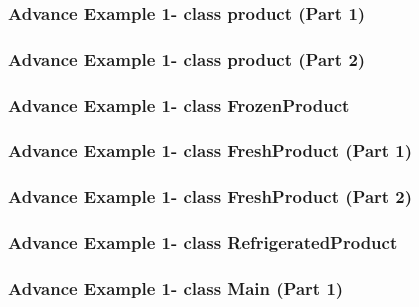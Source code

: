 \documentclass[11pt]{beamer}
\begin{document}
\begin{frame}
\frametitle{Advance Example 1- class product (Part 1)}

\end{frame}

\begin{frame}
\frametitle{Advance Example 1- class product (Part 2)}

\end{frame}

\begin{frame}
\frametitle{Advance Example 1- class FrozenProduct}

\end{frame}

\begin{frame}
\frametitle{Advance Example 1- class FreshProduct (Part 1)}

\end{frame}

\begin{frame}
\frametitle{Advance Example 1- class FreshProduct (Part 2)}

\end{frame}

\begin{frame}
\frametitle{Advance Example 1- class RefrigeratedProduct}

\end{frame}

\begin{frame}
\frametitle{Advance Example 1- class Main (Part 1)}

\end{frame}
\end{document}
